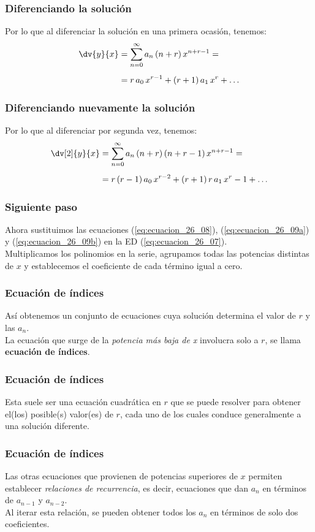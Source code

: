 \begin{frame}
\frametitle{Diferenciando la solución}
Por lo que al diferenciar la solución en una primera ocasión, tenemos:
\begin{align}
\begin{aligned}
\dv{y}{x} &= \sum_{n=0}^{\infty} a_{n} \, (n + r) \, x^{n+r-1} = \\[0.5em]
&= r \, a_{0} \, x^{r-1} + (r + 1) \, a_{1} \, x^{r} + \ldots
\end{aligned}
\label{eq:ecuacion_26_09a}
\end{align}
\end{frame}
\begin{frame}
\frametitle{Diferenciando nuevamente la solución}
Por lo que al diferenciar por segunda vez, tenemos:
\begin{align}
\begin{aligned}
\dv[2]{y}{x} &= \sum_{n=0}^{\infty} a_{n} \, (n + r) \, (n + r - 1) \, x^{n+r-1} = \\[0.5em]
&= r \, (r - 1) \, a_{0} \, x^{r-2} + (r + 1) \, r \, a_{1} \, x^{r}-1 + \ldots
\end{aligned}
\label{eq:ecuacion_26_09b}
\end{align}
\end{frame}
\begin{frame}
\frametitle{Siguiente paso}
Ahora sustituimos las ecuaciones (\ref{eq:ecuacion_26_08}), (\ref{eq:ecuacion_26_09a}) y (\ref{eq:ecuacion_26_09b}) en la ED (\ref{eq:ecuacion_26_07}).
\\
\bigskip
Multiplicamos los polinomios en la serie, agrupamos todas las potencias distintas de $x$ y establecemos el coeficiente de cada término igual a cero.
\end{frame}
\begin{frame}
\frametitle{Ecuación de índices}
Así obtenemos un conjunto de ecuaciones cuya solución determina el valor de $r$ y las $a_{n}$.
\\
\bigskip
\pause
La ecuación que surge de la \emph{potencia más baja de x} involucra solo a $r$, se llama \textbf{ecuación de índices}.
\end{frame}
\begin{frame}
\frametitle{Ecuación de índices}
Esta suele ser una ecuación cuadrática en $r$ que se puede resolver para obtener el(los) posible(s) valor(es) de $r$, cada uno de los cuales conduce generalmente a una solución diferente.
\end{frame}
\begin{frame}
\frametitle{Ecuación de índices}
Las otras ecuaciones que provienen de potencias superiores de $x$ permiten establecer \emph{relaciones de recurrencia}, es decir, ecuaciones que dan $a_{n}$ en términos de $a_{n-1}$ y $a_{n-2}$.
\\
\bigskip
Al iterar esta relación, se pueden obtener todos los $a_{n}$ en términos de solo dos coeficientes.
\end{frame}
